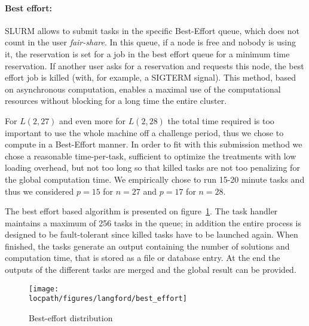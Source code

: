 \paragraph{Best effort: }
SLURM allows to submit tasks in the specific Best-Effort queue, which does not count in the user \textit{fair-share}. In this queue, if a node is free and nobody is using it, the reservation is set for a job in the best effort queue for a minimum time reservation. 
If another user asks for a reservation and requests this node, the best effort job is killed (with, for example, a SIGTERM signal). This method, based on asynchronous computation, enables a maximal use of the computational resources without blocking for a long time the entire cluster.

For $L(2,27)$ and even more for $L(2,28)$ the total time required is too important to use the whole machine off a challenge period, thus we chose to compute in a Best-Effort manner.
In order to fit with this submission method we chose a reasonable time-per-task, sufficient to optimize the treatments with low loading overhead, but not too long so that killed tasks are not too penalizing for the global computation time. We empirically chose to run 15-20 minute tasks and thus we considered $p=15$ for $n=27$ and $p=17$ for $n=28$. 

The best effort based algorithm is presented on figure~\ref{fig:graphe_besteffort}.
The task handler maintains a maximum of 256 tasks in the queue; in addition the entire process is designed to be fault-tolerant since killed tasks have to be launched again.
When finished, the tasks generate an output containing the number of solutions and computation time, that is stored as a file or database entry. 
At the end the outputs of the different tasks are merged and the global result can be provided.  

\begin{figure}[t!]
\centering
\texttt{[image: \\locpath/figures/langford/best\_effort]}
\caption{Best-effort distribution}
\label{fig:graphe_besteffort}
\end{figure}

